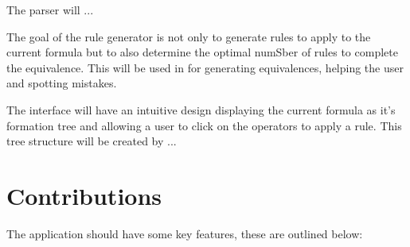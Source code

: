 \documentclass{report}
\begin{document}
The parser will ...

The goal of the rule generator is not only to generate rules to apply to the current formula but to also determine the optimal numSber of rules to complete the equivalence. This will be used in for generating equivalences, helping the user and spotting mistakes.

The interface will have an intuitive design displaying the current formula as it's formation tree and allowing a user to click on the operators to apply a rule. This tree structure will be created by ...

\section{Contributions}

The application should have some key features, these are outlined below:
\end{document}
